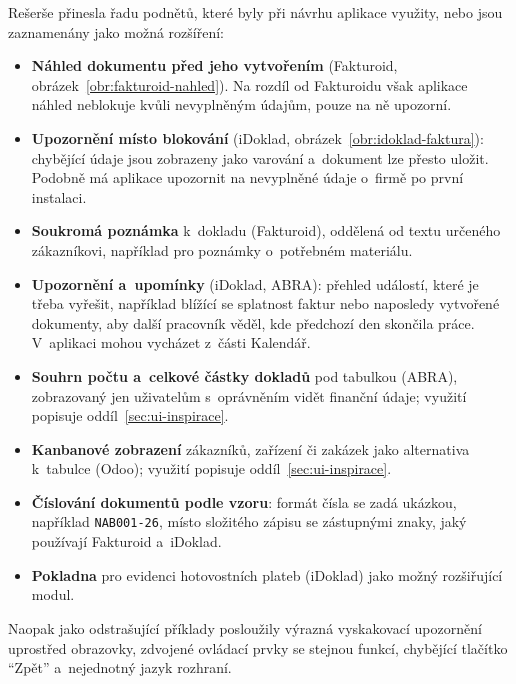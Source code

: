 Rešerše přinesla řadu podnětů, které byly při návrhu aplikace využity, nebo jsou zaznamenány jako možná rozšíření:
\begin{itemize}
\item \textbf{Náhled dokumentu před jeho vytvořením} (Fakturoid, obrázek~\ref{obr:fakturoid-nahled}). Na rozdíl od Fakturoidu však aplikace náhled neblokuje kvůli nevyplněným údajům, pouze na ně upozorní.
\item \textbf{Upozornění místo blokování} (iDoklad, obrázek~\ref{obr:idoklad-faktura}): chybějící údaje jsou zobrazeny jako varování a~dokument lze přesto uložit. Podobně má aplikace upozornit na nevyplněné údaje o~firmě po první instalaci.
\item \textbf{Soukromá poznámka} k~dokladu (Fakturoid), oddělená od textu určeného zákazníkovi, například pro poznámky o~potřebném materiálu.
\item \textbf{Upozornění a~upomínky} (iDoklad, ABRA): přehled událostí, které je třeba vyřešit, například blížící se splatnost faktur nebo naposledy vytvořené dokumenty, aby další pracovník věděl, kde předchozí den skončila práce. V~aplikaci mohou vycházet z~části Kalendář.
\item \textbf{Souhrn počtu a~celkové částky dokladů} pod tabulkou (ABRA), zobrazovaný jen uživatelům s~oprávněním vidět finanční údaje; využití popisuje oddíl~\ref{sec:ui-inspirace}.
\item \textbf{Kanbanové zobrazení} zákazníků, zařízení či zakázek jako alternativa k~tabulce (Odoo); využití popisuje oddíl~\ref{sec:ui-inspirace}.
\item \textbf{Číslování dokumentů podle vzoru}: formát čísla se zadá ukázkou, například \texttt{NAB001-26}, místo složitého zápisu se zástupnými znaky, jaký používají Fakturoid a~iDoklad.
\item \textbf{Pokladna} pro evidenci hotovostních plateb (iDoklad) jako možný rozšiřující modul.
\end{itemize}
Naopak jako odstrašující příklady posloužily výrazná vyskakovací upozornění uprostřed obrazovky, zdvojené ovládací prvky se stejnou funkcí, chybějící tlačítko \enquote{Zpět} a~nejednotný jazyk rozhraní.
